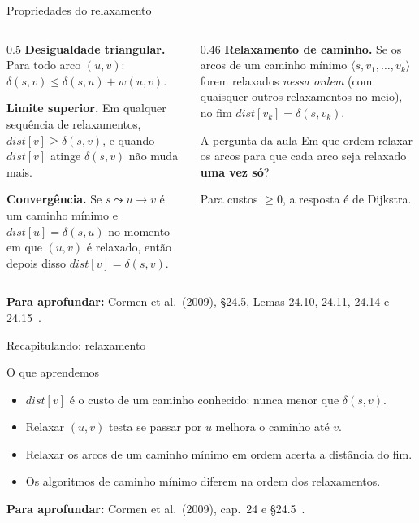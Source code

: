\documentclass[aspectratio=169,xcolor=table]{beamer}
\newcommand{\fonte}[1]{%
  \vfill
  {\tiny\color{gray!55!black}\textbf{Para aprofundar:} #1\par}%
}
\begin{document}
\begin{frame}{Propriedades do relaxamento}
  \begin{columns}[T]
    \begin{column}{0.5\textwidth}
      \scriptsize
      \textbf{Desigualdade triangular.} Para todo arco $(u,v)$:
      $\delta(s,v) \le \delta(s,u) + w(u,v)$.
      \medskip

      \textbf{Limite superior.} Em qualquer sequência de relaxamentos,
      $\mathit{dist}[v] \ge \delta(s,v)$, e quando $\mathit{dist}[v]$ atinge $\delta(s,v)$ não
      muda mais.
      \medskip

      \textbf{Convergência.} Se $s \leadsto u \to v$ é um caminho mínimo e
      $\mathit{dist}[u] = \delta(s,u)$ no momento em que $(u,v)$ é relaxado, então depois
      disso $\mathit{dist}[v] = \delta(s,v)$.
    \end{column}
    \begin{column}{0.46\textwidth}
      \scriptsize
      \textbf{Relaxamento de caminho.} Se os arcos de um caminho mínimo
      $\langle s, v_1, \dots, v_k \rangle$ forem relaxados \emph{nessa ordem} (com quaisquer
      outros relaxamentos no meio), no fim $\mathit{dist}[v_k] = \delta(s, v_k)$.
      \medskip

      \begin{block}{A pergunta da aula}
        \scriptsize Em que ordem relaxar os arcos para que cada arco seja relaxado
        \textbf{uma vez só}?
      \end{block}
      \medskip

      Para custos $\ge 0$, a resposta é de Dijkstra.
    \end{column}
  \end{columns}
  \fonte{Cormen et al.\ (2009), \S 24.5, Lemas 24.10, 24.11, 24.14 e
    24.15~\cite{cormen2009introduction}.}
\end{frame}

\begin{frame}{Recapitulando: relaxamento}
  \begin{block}{O que aprendemos}
    \begin{itemize}
      \item $\mathit{dist}[v]$ é o custo de um caminho conhecido: nunca menor que $\delta(s,v)$.
      \item Relaxar $(u,v)$ testa se passar por $u$ melhora o caminho até $v$.
      \item Relaxar os arcos de um caminho mínimo em ordem acerta a distância do fim.
      \item Os algoritmos de caminho mínimo diferem na ordem dos relaxamentos.
    \end{itemize}
  \end{block}
  \fonte{Cormen et al.\ (2009), cap.~24 e \S 24.5~\cite{cormen2009introduction}.}
\end{frame}
\end{document}
